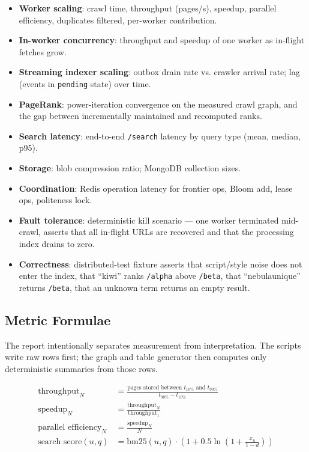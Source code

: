 \documentclass[11pt,a4paper]{article}
\newcommand{\code}[1]{\texttt{#1}}
\begin{document}
\begin{itemize}[leftmargin=1.4em]
  \item \textbf{Worker scaling}: crawl time, throughput (pages/s), speedup, parallel efficiency, duplicates filtered, per-worker contribution.
  \item \textbf{In-worker concurrency}: throughput and speedup of one worker as in-flight fetches grow.
  \item \textbf{Streaming indexer scaling}: outbox drain rate vs. crawler arrival rate; lag (events in \code{pending} state) over time.
  \item \textbf{PageRank}: power-iteration convergence on the measured crawl graph, and the gap between incrementally maintained and recomputed ranks.
  \item \textbf{Search latency}: end-to-end \code{/search} latency by query type (mean, median, p95).
  \item \textbf{Storage}: blob compression ratio; MongoDB collection sizes.
  \item \textbf{Coordination}: Redis operation latency for frontier ops, Bloom add, lease ops, politeness lock.
  \item \textbf{Fault tolerance}: deterministic kill scenario --- one worker terminated mid-crawl, asserts that all in-flight URLs are recovered and that the processing index drains to zero.
  \item \textbf{Correctness}: distributed-test fixture asserts that script/style noise does not enter the index, that ``kiwi'' ranks \code{/alpha} above \code{/beta}, that ``nebulaunique'' returns \code{/beta}, that an unknown term returns an empty result.
\end{itemize}

\subsection{Metric Formulae}

The report intentionally separates measurement from interpretation. The scripts write raw rows first; the graph and table generator then computes only deterministic summaries from those rows.

\begin{align}
\text{throughput}_N &= \frac{\text{pages stored between } t_{10\%} \text{ and } t_{90\%}}{t_{90\%} - t_{10\%}}\\
\text{speedup}_N &= \frac{\text{throughput}_N}{\text{throughput}_1}\\
\text{parallel efficiency}_N &= \frac{\text{speedup}_N}{N}\\
\text{search score}(u, q) &= \text{bm25}(u, q) \cdot \left(1 + 0.5 \ln\!\left(1 + \tfrac{x_u}{1-d}\right)\right)
\end{align}
\end{document}
